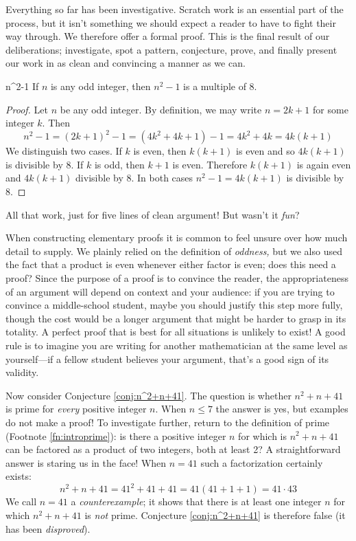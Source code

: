 Everything so far has been investigative. Scratch work is an essential part of the process, but it isn't something we should expect a reader to have to fight their way through. We therefore offer a formal proof. This is the final result of our deliberations; investigate, spot a pattern, conjecture, prove, and finally present our work in as clean and convincing a manner as we can.

\begin{thm}{}{n^2-1}
	If $n$ is any odd integer, then $n^2-1$ is a multiple of 8.
\end{thm}

\begin{proof}
	Let $n$ be any odd integer. By definition, we may write $n=2k+1$ for some integer $k$. Then
	\[
		n^2-1=(2k+1)^2-1=(4k^2+4k+1)-1=4k^2+4k=4k(k+1)
	\]
	We distinguish two cases. If $k$ is even, then $k(k+1)$ is even and so $4k(k+1)$ is divisible by 8.\smallbreak
	If $k$ is odd, then $k+1$ is even. Therefore $k(k+1)$ is again even and $4k(k+1)$ divisible by 8.\smallbreak
	In both cases $n^2-1=4k(k+1)$ is divisible by 8.
\end{proof}

All that work, just for five lines of clean argument! But wasn't it \emph{fun}?\medbreak

When constructing elementary proofs it is common to feel unsure over how much detail to supply. We plainly relied on the definition of \emph{oddness,} but we also used the fact that a product is even whenever either factor is even; does this need a proof? Since the purpose of a proof is to convince the reader, the appropriateness of an argument will depend on context and your audience: if you are trying to convince a middle-school student, maybe you should justify this step more fully, though the cost would be a longer argument that might be harder to grasp in its totality. A perfect proof that is best for all situations is unlikely to exist! A good rule is to imagine you are writing for another mathematician at the same level as yourself---if a fellow student believes your argument, that's a good sign of its validity.
\bigbreak

Now consider Conjecture \ref{conj:n^2+n+41}. The question is whether $n^2+n+41$ is prime for \emph{every} positive integer $n$. When $n\le 7$ the answer is yes, but examples do not make a proof! To investigate further, return to the definition of prime (Footnote \ref{fn:introprime}): is there a positive integer $n$ for which is $n^2+n+41$ can be factored as a product of two integers, both at least 2? A straightforward answer is staring us in the face! When $n=41$ such a factorization certainly exists:
\[
	n^2+n+41 =41^2+41+41 =41(41+1+1) =41\cdot 43
\]
We call $n=41$ a \emph{counterexample}; it shows that there is at least one integer $n$ for which $n^2+n+41$ is \emph{not} prime. Conjecture \ref{conj:n^2+n+41} is therefore false (it has been \emph{disproved}).



